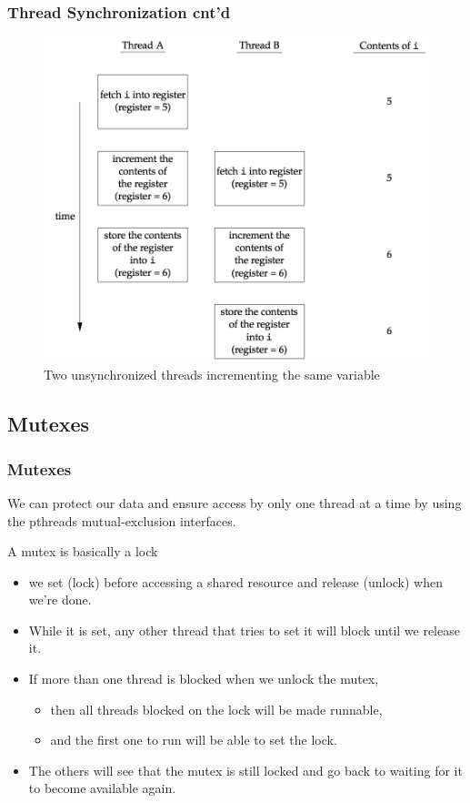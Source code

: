 \documentclass[newPxFont,sthlmFooter,nooffset]{beamer}
\begin{document}
\begin{frame}[t]
  \frametitle{Thread Synchronization cnt'd}

  \begin{figure}[h]
    \centering
    \includegraphics[width=0.7\linewidth]{figure/fig11-9}
    \caption{Two unsynchronized threads incrementing the same variable}
    \label{fig:work}
  \end{figure}  


\end{frame}




\subsection{Mutexes}

\begin{frame}[t]
  \frametitle{Mutexes}
  We can protect our data and ensure access by only one thread at a time by using the pthreads mutual-exclusion interfaces. 

A mutex is basically a lock
\begin{itemize}
\item we set (lock) before accessing a shared resource and release (unlock) when we’re done. 
\item While it is set, any other thread that tries to set it will block until we release it.
\item If more than one thread is blocked when we unlock the mutex,
  \begin{itemize}
  \item then all threads blocked on the lock will be made runnable,
  \item and the first one to run will be able to set the lock.
  \end{itemize}
\item The others will see that the mutex is still locked and go back to waiting for it to become available again. 
\end{itemize}

\end{frame}
\end{document}
